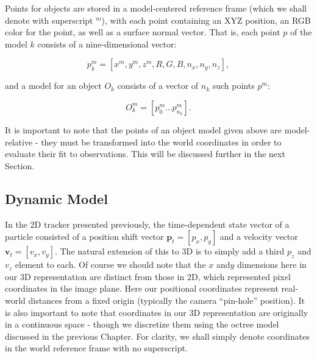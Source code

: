 Points for objects are stored in a model-centered reference frame (which we shall denote with superscript $^m$), with each point containing an XYZ position, an RGB color for the point, as well as a surface normal vector. That is, each point $p$ of the model $k$ consists of a nine-dimensional vector: 

\begin{equation} \label{eqn:point}
p^m_k = [x^m,y^m,z^m,R,G,B,n_x,n_y,n_z],
\end{equation}
 
 and a model for an object $O_k$ consists of a vector of $n_k$ such points $p^m$:
 
 \begin{equation} \label{eqn:model}
 O^m_k = [p^m_0 ... p^m_{n_k}].
\end{equation}

It is important to note that the points of an object model given above are model-relative - they must be transformed into the world coordinates in order to evaluate their fit to observations. This will be discussed further in the next Section.


\subsection{Dynamic Model}
\label{sec:Dynamic_model}
In the 2D tracker presented previously, the time-dependent state vector of a particle consisted of a position shift vector $\mathbf{p}_t=[p_x,p_y]$ and a velocity vector $\mathbf{v}_t=[v_x,v_y]$. The natural extension of this to 3D is to simply add a third $p_z$ and $v_z$ element to each. Of course we should note that the $x$ and$y$ dimensions here in our 3D representation are distinct from those in 2D, which represented pixel coordinates in the image plane. Here our positional coordinates represent real-world distances from a fixed origin (typically the camera ``pin-hole'' position). It is also important to note that coordinates in our 3D representation are originally in a continuous space - though we discretize them using the octree model discussed in the previous Chapter. For clarity, we shall simply denote coordinates in the world reference frame with no superscript.

